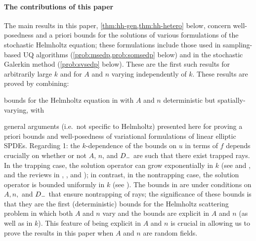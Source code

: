 \paragraph{The contributions of this paper} The main results in this paper, \cref{thm:hh-gen,thm:hh-hetero} below, concern well-posedness and a priori bounds for the solutions of various formulations of the stochastic Helmholtz equation; these formulations include those used in sampling-based UQ algorithms (\cref{prob:msedp,prob:somsedp} below) and in the stochastic Galerkin method (\cref{prob:svsedp} below). These are the first such results for arbitrarily large $k$ and for $A$ and $n$ varying independently of $k$. These results are proved by combining:
\ben
\item bounds for the Helmholtz equation in \cite{GrPeSp:18} with $A$ and $n$ deterministic but spatially-varying, with
\item general arguments (i.e.~not specific to Helmholtz) presented here for proving a priori bounds and well-posedness of variational formulations of linear elliptic SPDEs.
\een
Regarding 1: the $k$-dependence of the bounds on $u$ in terms of $f$ depends crucially on whether or not $A$, $n$, and $D_{-}$ are such that there exist trapped rays. In the trapping case, the solution operator can grow exponentially in $k$ (see \cite{Ra:71,Bu:98,PoVo:99,CaPo:02,Be:03a} and \cite[Section 2.5]{BeChGrLaLi:11}, and the reviews in \cite[Section 6]{MoSp:17}, \cite[Section 1.1]{ChSpGiSm:17}, and \cite[Section 1]{GrPeSp:18}); in contrast, in the nontrapping case, the solution operator is bounded uniformly in $k$ (see \cite{Va:75,MeSj:78,Bu:02}). The bounds in \cite{GrPeSp:18} are under conditions on $A,n,$ and $D_{-}$ that ensure nontrapping of rays; the significance of these bounds is that they are the first (deterministic) bounds for the Helmholtz scattering problem in which both $A$ and $n$ vary and the bounds are explicit in $A$ and $n$ (as well as in $k$). This feature of being explicit in $A$ and $n$ is crucial in allowing us to prove the results in this paper when $A$ and $n$ are random fields.

